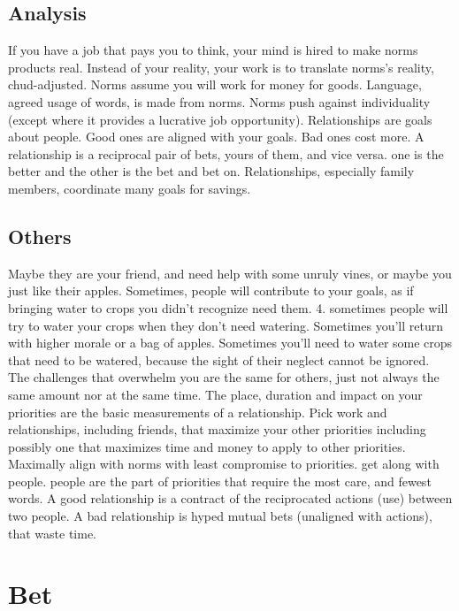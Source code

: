 \documentclass[
]{book}
\begin{document}
\section{Analysis}\label{analysis}

If you have a job that pays you to think, your mind is hired to make norms products real.
Instead of your reality, your work is to translate norms's reality, chud-adjusted.
Norms assume you will work for money for goods.
Language, agreed usage of words, is made from norms.
Norms push against individuality (except where it provides a lucrative job opportunity).
Relationships are goals about people.
Good ones are aligned with your goals.
Bad ones cost more.
A relationship is a reciprocal pair of bets, yours of them, and vice versa. one is the better and the other is the bet and bet on.
Relationships, especially family members, coordinate many goals for savings.

\section{Others}\label{others}

Maybe they are your friend, and need help with some unruly vines, or maybe you just like their apples.
Sometimes, people will contribute to your goals, as if bringing water to crops you didn't recognize need them. 4. sometimes people will try to water your crops when they don't need watering.
Sometimes you'll return with higher morale or a bag of apples.
Sometimes you'll need to water some crops that need to be watered, because the sight of their neglect cannot be ignored.
The challenges that overwhelm you are the same for others, just not always the same amount nor at the same time.
The place, duration and impact on your priorities are the basic measurements of a relationship.
Pick work and relationships, including friends, that maximize your other priorities including possibly one that maximizes time and money to apply to other priorities.
Maximally align with norms with least compromise to priorities. get along with people.
people are the part of priorities that require the most care, and fewest words.
A good relationship is a contract of the reciprocated actions (use) between two people.
A bad relationship is hyped mutual bets (unaligned with actions), that waste time.

\chapter{Bet}\label{bet}
\end{document}
